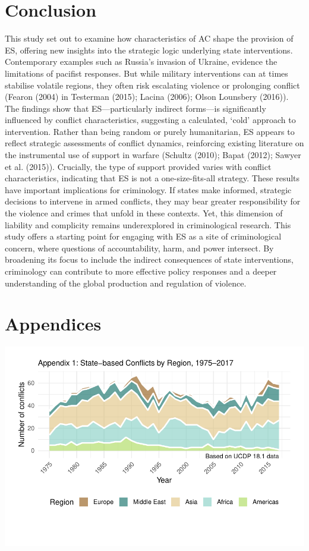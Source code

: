\documentclass[
]{article}
\begin{document}
\section{Conclusion}\label{conclusion}

This study set out to examine how characteristics of AC shape the
provision of ES, offering new insights into the strategic logic
underlying state interventions. Contemporary examples such as Russia's
invasion of Ukraine, evidence the limitations of pacifist responses. But
while military interventions can at times stabilise volatile regions,
they often risk escalating violence or prolonging conflict (Fearon
(2004) in Testerman (2015); Lacina (2006); Olson Lounsbery (2016)). The
findings show that ES---particularly indirect forms---is significantly
influenced by conflict characteristics, suggesting a calculated, `cold'
approach to intervention. Rather than being random or purely
humanitarian, ES appears to reflect strategic assessments of conflict
dynamics, reinforcing existing literature on the instrumental use of
support in warfare (Schultz (2010); Bapat (2012); Sawyer et al. (2015)).
Crucially, the type of support provided varies with conflict
characteristics, indicating that ES is not a one-size-fits-all strategy.
These results have important implications for criminology. If states
make informed, strategic decisions to intervene in armed conflicts, they
may bear greater responsibility for the violence and crimes that unfold
in these contexts. Yet, this dimension of liability and complicity
remains underexplored in criminological research. This study offers a
starting point for engaging with ES as a site of criminological concern,
where questions of accountability, harm, and power intersect. By
broadening its focus to include the indirect consequences of state
interventions, criminology can contribute to more effective policy
responses and a deeper understanding of the global production and
regulation of violence.

\section{Appendices}\label{appendices}

\includegraphics{Dissertation_writeup_files/figure-latex/Region (Appendix 1)-1.pdf}
\end{document}
